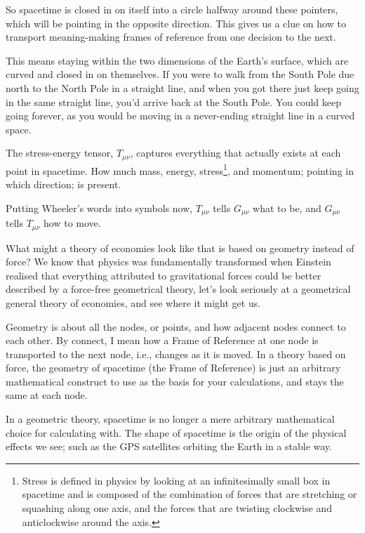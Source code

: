 So spacetime is closed in on itself into a circle halfway around these pointers, which will be pointing in the opposite direction. This gives us a clue on how to transport meaning\hyp{}making frames of reference from one decision to the next.


This means staying within the two dimensions of the Earth's surface, which are curved and closed in on themselves. If you were to walk from the South Pole due north to the North Pole in a straight line, and when you got there just keep going in the same straight line, you'd arrive back at the South Pole. You could keep going forever, as you would be moving in a never\hyp{}ending straight line in a curved space.


The stress\hyp{}energy tensor, $T_{\mu\nu}$, captures everything that actually exists at each point in spacetime. How much mass, energy, stress\footnote{Stress is defined in physics by looking at an infinitesimally small box in spacetime and is composed of the combination of forces that are stretching or squashing along one axis, and the forces that are twisting clockwise and anticlockwise around the axis.}, and momentum; pointing in which direction; is present. 


Putting Wheeler's words into symbols now, $T_{\mu\nu}$ tells $G_{\mu\nu}$ what to be, and $G_{\mu\nu}$ tells $T_{\mu\nu}$ how to move.


What might a theory of economies look like that is based on geometry instead of force? 
We know that physics was fundamentally transformed when Einstein  realised that everything attributed to gravitational forces could be better described by a force\hyp{}free geometrical theory, let's look seriously at a geometrical general theory of economies, and see where it might get us.


Geometry is about all the nodes, or points, and how adjacent nodes connect to each other. By connect, I mean how a Frame of Reference at one node is transported to the next node, i.e., changes as it is moved. In a theory based on force, the geometry of spacetime (the Frame of Reference) is just an arbitrary mathematical construct to use as the basis for your calculations, and stays the same at each node. 


In a geometric theory, spacetime is no longer a mere arbitrary mathematical choice for calculating with. The shape of spacetime is the origin of the physical effects we see; such as the GPS satellites orbiting the Earth in a stable way. 




